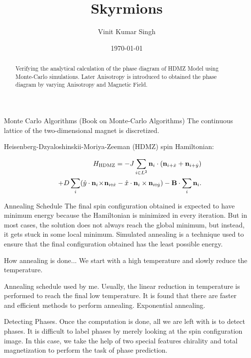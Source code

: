 \documentclass[reprint,amsmath,amssymb,aps,showpacs,superscriptaddress,prl]{revtex4-1}
\newcommand{\ba}{\begin{eqnarray}}
\newcommand{\ea}{\end{eqnarray}}
\renewcommand{\v}[1]{{\bf #1}}
\newcommand{\nn}{\nonumber \\}
\begin{document}
%
\title{Skyrmions}

\author{Vinit Kumar Singh}
\date{\today}

\begin{abstract}
Verifying the analytical calculation of the phase diagram of HDMZ Model using Monte-Carlo simulations. Later Anisotropy is introduced to obtained the phase diagram by varying Anisotropy and Magnetic Field. 
\end{abstract}
\maketitle

Monte Carlo Algorithms  (Book on Monte-Carlo Algorithms)
The continuous lattice of the two-dimensional magnet is discretized.

Heisenberg-Dzyaloshinskii-Moriya-Zeeman (HDMZ) spin Hamiltonian:

\ba && H_{\rm HDMZ} = -J \sum_{i\in L^2} \v n_i \cdot (\v n_{i+\hat{x}} + \v n_{i+\hat{y}} ) \nn
& & + D \sum_i ( \hat{y} \cdot \v n_i \! \times \! \v n_{i\! +\! \hat{x}} - \hat{x} \cdot \v n_i \times \v n_{i\! +\! \hat{y}} )  - \v B \cdot \sum_i \v n_i .  \label{eq:HDMZ} \ea
%

Annealing Schedule
The final spin configuration obtained is expected to have minimum energy because the Hamiltonian is minimized in every iteration. But in most cases, the solution does not always reach the global minimum, but instead, it gets stuck in some local minimum. Simulated annealing is a technique used to ensure that the final configuration obtained has the least possible energy. 


How annealing is done...
We start with a high temperature and slowly reduce the temperature. 


Annealing schedule used by me.  
Usually, the linear reduction in temperature is performed to reach the final low temperature. It is found that there are faster and efficient methods to perform annealing. 
Exponential annealing. 


Detecting Phases.
Once the computation is done, all we are left with is to detect phases. 
It is difficult to label phases by merely looking at the spin configuration image. 
In this case, we take the help of two special features chirality and total magnetization to perform the task of phase prediction.
\end{document}
